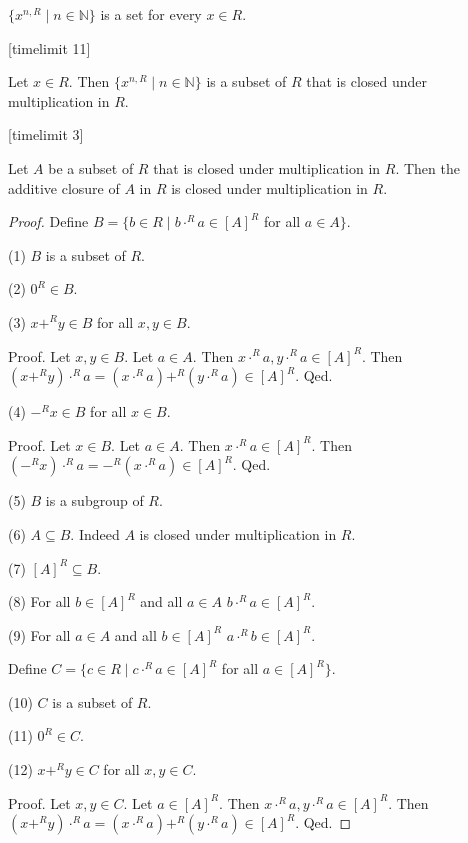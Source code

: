 \documentclass[11pt]{article}
\newcommand{\powers}[2]{\{{#1}^{n,#2} \mid n \in \mathbb{N}\}}
\begin{document}
\begin{forthel}
\begin{lemma} $\powers{x}{R}$ is a set for every $x \in R$.
\end{lemma}

[timelimit 11]
\begin{lemma} Let $x \in R$. Then
$\powers{x}{R}$ is a subset of $R$ that is closed under multiplication in $R$.
\end{lemma}
[timelimit 3]

\begin{lemma}
Let $A$ be a subset of $R$ that is closed under multiplication in $R$.
Then the additive closure of $A$ in $R$ is closed under multiplication in $R$.
\end{lemma}

\begin{proof}
Define $B = \{b \in R \mid b \cdot^{R} a \in [A]^{R}$ for all $a \in A\}$.

(1) $B$ is a subset of $R$.

(2) $0^{R} \in B$.

(3) $x +^{R} y \in B$ for all $x,y \in B$.

Proof.
Let $x,y \in B$.
Let $a \in A$. Then $x \cdot^{R} a, y \cdot^{R} a \in [A]^{R}$.
Then $(x +^{R} y) \cdot^{R} a = (x \cdot^{R} a) +^{R} (y \cdot^{R} a) \in [A]^{R}$.
Qed.

(4) $-^{R} x \in B$ for all $x \in B$.

Proof.
Let $x \in B$.
Let $a \in A$. Then $x \cdot^{R} a \in [A]^{R}$.
Then $(-^{R} x) \cdot^{R} a = -^{R} (x\cdot^{R} a) \in [A]^{R}$.
Qed.

(5) $B$ is a subgroup of $R$.

(6) $A \subseteq B$. Indeed $A$ is closed under multiplication in $R$.

(7) $[A]^{R} \subseteq B$.

(8) For all $b \in [A]^{R}$ and all $a \in A$ $b \cdot^{R} a \in [A]^{R}$.

(9) For all $a \in A$ and all $b \in [A]^{R}$  $a \cdot^{R} b \in [A]^{R}$.

Define $C = \{c \in R \mid c \cdot^{R} a \in [A]^{R}$ for all $a \in [A]^{R}\}$.

(10) $C$ is a subset of $R$.

(11) $0^{R} \in C$.

(12) $x +^{R} y \in C$ for all $x,y \in C$.

Proof.
Let $x,y \in C$.
Let $a \in [A]^{R}$. Then $x \cdot^{R} a, y \cdot^{R} a \in [A]^{R}$.
Then $(x +^{R} y) \cdot^{R} a = (x \cdot^{R} a) +^{R} (y \cdot^{R} a) \in [A]^{R}$.
Qed.


\end{proof}
\end{forthel}
\end{document}
